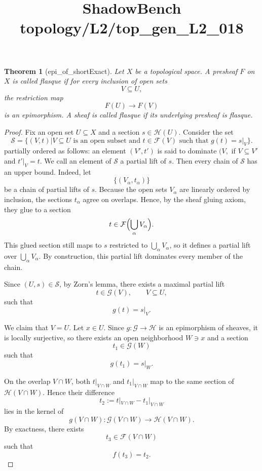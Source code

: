 \documentclass{article}
\title{ShadowBench topology/L2/top\_gen\_L2\_018}
\newtheorem{theorem}{Theorem}
\begin{document}
\maketitle

\begin{theorem}[epi_of_shortExact]Let \(X\) be a topological space. A presheaf \(F\) on \(X\) is called \emph{flasque} if for every inclusion of open sets
\[
V \subseteq U,
\]
the restriction map
\[
F(U)\to F(V)
\]
is an epimorphism. A sheaf is called \emph{flasque} if its underlying presheaf is flasque.
\end{theorem}

\begin{proof}
Fix an open set \(U \subseteq X\) and a section \(s \in \mathcal H(U)\). Consider the set
\[
\mathcal S = \{(V,t) | V \subseteq U \text{ is an open subset and } t \in \mathcal{F}(V) \text{ such that } g(t) = s|_V\}.
\]
partially ordered as follows: an element \((V',t') \) is said to dominate \((V,\) if \(V \subseteq V'\) and \(t'|_V = t\). We call an element of \(\mathcal S\) a partial lift of $s$. Then every chain of \(\mathcal S\) has an upper bound. Indeed, let
\[
\{(V_\alpha,t_\alpha)\}
\]
be a chain of partial lifts of \(s\).
Because the open sets \(V_\alpha\) are linearly ordered by inclusion, the sections \(t_\alpha\) agree on overlaps.
Hence, by the sheaf gluing axiom, they glue to a section
\[
t \in \mathcal{F}\Bigl(\bigcup_\alpha V_\alpha\Bigr).
\]
This glued section still maps to \(s\) restricted to \(\bigcup_\alpha V_\alpha\), so it defines a partial lift over \(\bigcup_\alpha V_\alpha\).
By construction, this partial lift dominates every member of the chain.

Since \((U,s) \in \mathcal{S}\), by Zorn's lemma, there exists a maximal partial lift
\[
t \in \mathcal G(V),
\qquad
V \subseteq U,
\]
such that
\[
g(t) = s|_V.
\]

We claim that \(V=U\).
Let \(x \in U\).
Since \(g : \mathcal G \to \mathcal H\) is an epimorphism of sheaves, it is locally surjective, so there exists an open neighborhood \(W \ni x\) and a section
\[
t_1 \in \mathcal G(W)
\]
such that
\[
g(t_1)=s|_W.
\]

On the overlap \(V \cap W\), both \(t|_{V\cap W}\) and \(t_1|_{V\cap W}\) map to the same section of \(\mathcal H(V\cap W)\).
Hence their difference
\[
t_2 := t|_{V\cap W} - t_1|_{V\cap W}
\]
lies in the kernel of
\[
g(V\cap W) : \mathcal G(V\cap W)\to \mathcal H(V\cap W).
\]
By exactness, there exists
\[
t_3 \in \mathcal F(V\cap W)
\]
such that
\[
f(t_3)=t_2.
\]


\end{proof}
\end{document}

